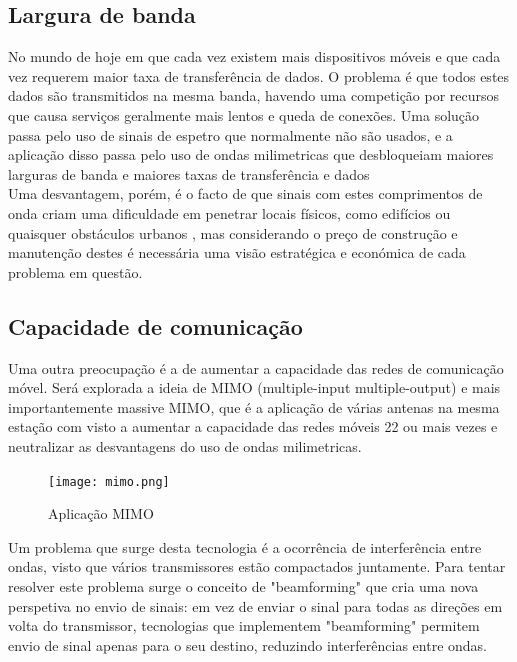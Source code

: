 \documentclass{llncs}
\begin{document}
\subsection{Largura de banda}
\hspace*{1.5em} No mundo de hoje em que cada vez existem mais dispositivos móveis e que cada vez requerem maior taxa de transferência de dados. O problema é que todos estes dados são transmitidos na mesma banda, havendo uma competição por recursos que causa serviços geralmente mais lentos e queda de conexões. Uma solução passa pelo uso de sinais de espetro que normalmente não são usados, e a aplicação disso passa pelo uso de ondas milimetricas que desbloqueiam maiores larguras de banda e maiores taxas de transferência e dados \cite{Mis:El} \\
\hspace*{1.5em} Uma desvantagem, porém, é o facto de que sinais com estes comprimentos de onda criam uma dificuldade em penetrar locais físicos, como edifícios ou quaisquer obstáculos urbanos \cite{everything:to:know}, mas considerando o preço de construção e manutenção destes é necessária uma visão estratégica e económica de cada problema em questão.
\subsection{Capacidade de comunicação}
\hspace*{1.5em} Uma outra preocupação é a de aumentar a capacidade das redes de comunicação móvel. Será explorada a ideia de MIMO (multiple-input multiple-output) e mais importantemente massive MIMO, que é a aplicação de várias antenas na mesma estação com visto a aumentar a capacidade das redes móveis 22 ou mais vezes \cite{everything:to:know} e neutralizar as desvantagens do uso de ondas milimetricas. \cite{Mis:El}

\begin{figure}
    \centering
    \texttt{[image: mimo.png]}
    \caption{Aplicação MIMO \cite{MIMO}}
\end{figure}

\hspace*{1.5em} Um problema que surge desta tecnologia é a ocorrência de interferência entre ondas, visto que vários transmissores estão compactados juntamente. Para tentar resolver este problema surge o conceito de "beamforming" que cria uma nova perspetiva no envio de sinais: em vez de enviar o sinal para todas as direções em volta do transmissor, tecnologias que implementem "beamforming" permitem envio de sinal apenas para o seu destino, reduzindo interferências entre ondas.
\end{document}
